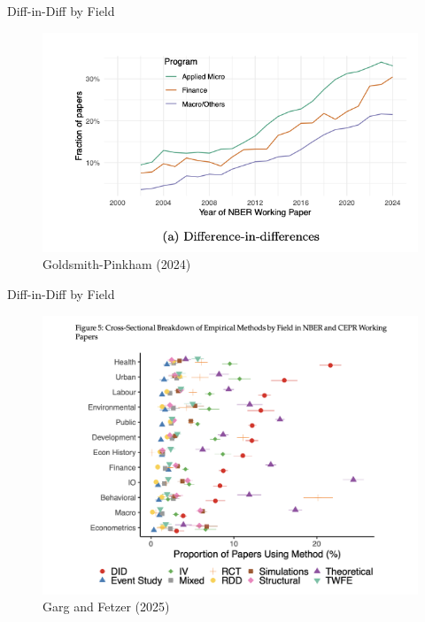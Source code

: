 \documentclass{beamer}
\begin{document}
\begin{frame}{Diff-in-Diff by Field}

	\begin{figure}
	\caption{Goldsmith-Pinkham (2024)}
	\includegraphics[scale=0.75]{./lecture_includes/paul_did}
	\end{figure}

\end{frame}

\begin{frame}{Diff-in-Diff by Field}

	\begin{figure}
	\caption{Garg and Fetzer (2025)}
	\includegraphics[scale=0.25]{./lecture_includes/did_growth2}
	\end{figure}

\end{frame}
\end{document}
